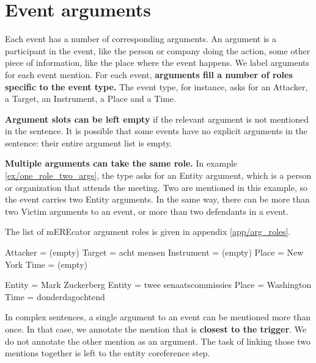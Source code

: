 \section{Event arguments}

Each event has a number of corresponding arguments. An argument is a participant in the event, like the person or company doing the action, some other piece of information, like the place where the event happens.
We label arguments for each event mention.
For each event, \textbf{arguments fill a number of roles specific to the event type.}
The  event type, for instance, asks for an Attacker, a Target, an Instrument, a Place and a Time. 

\textbf{Argument slots can be left empty} if the relevant argument is not mentioned in the sentence. It is possible that some events have no explicit arguments in the sentence: their entire argument list is empty. 

\textbf{Multiple arguments can take the same role.} In example \ref{ex/one_role_two_args}, the  type asks for an Entity argument, which is a person or organization that attends the meeting. Two are mentioned in this example, so the event carries two Entity arguments. In the same way, there can be more than two Victim arguments to an  event, or more than two defendants in a  event.

The list of mEREcator argument roles is given in appendix \ref{app/arg_roles}.

\begin{exe}
    \ex {}
        \expl {}
        \expl Attacker = (empty)
        \expl Target = acht mensen
        \expl Instrument = (empty)
        \expl Place = New York
        \expl Time = (empty)
        
    \ex\label{ex/one_role_two_args} 
        \expl {}
        \expl Entity = Mark Zuckerberg
        \expl Entity = twee senaatscommissies
        \expl Place = Washington
        \expl Time = donderdagochtend
\end{exe}

In complex sentences, a single argument to an event can be mentioned more than once. In that case, we annotate the mention that is \textbf{closest to the trigger}. We do not annotate the other mention as an argument. The task of linking those two mentions together is left to the entity coreference step.

